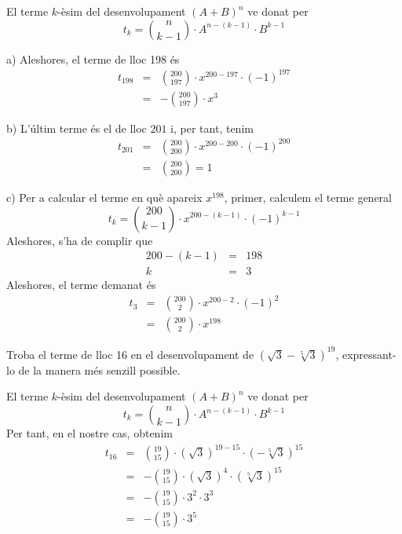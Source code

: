 \begin{solucio}
El terme $k$-èsim del desenvolupament $(A+B)^{n}$ ve donat per\[
t_{k}=\binom{n}{k-1}\cdot A^{n-(k-1)}\cdot B^{k-1}
\]

a) Aleshores, el terme de lloc 198 és\begin{eqnarray*}
t_{198} &=&\binom{200}{197}\cdot x^{200-197}\cdot \left( -1\right) ^{197} \\
&=&-\binom{200}{197}\cdot x^{3}
\end{eqnarray*}

b) L'últim terme és el de lloc $201$ i, per tant, tenim\begin{eqnarray*}
t_{201} &=&\binom{200}{200}\cdot x^{200-200}\cdot \left( -1\right) ^{200} \\
&=&\binom{200}{200}=1
\end{eqnarray*}

c) Per a calcular el terme en què apareix $x^{198}$, primer,
calculem el terme general\[
t_{k}=\binom{200}{k-1}\cdot x^{200-(k-1)}\cdot \left( -1\right) ^{k-1}
\]Aleshores, s'ha de complir que\begin{eqnarray*}
200-(k-1) &=&198 \\
k &=&3
\end{eqnarray*}Aleshores, el terme demanat és\begin{eqnarray*}
t_{3} &=&\binom{200}{2}\cdot x^{200-2}\cdot \left( -1\right) ^{2} \\
&=&\binom{200}{2}\cdot x^{198}
\end{eqnarray*}
\end{solucio}

\begin{exercici}
Troba el terme de lloc 16 en el desenvolupament de $\left( \sqrt{3}-\sqrt[5]{3}\right) ^{19}$, expressant-lo de la manera més senzill possible.
\end{exercici}

\begin{solucio}
El terme $k$-èsim del desenvolupament $(A+B)^{n}$ ve donat per\[
t_{k}=\binom{n}{k-1}\cdot A^{n-(k-1)}\cdot B^{k-1}
\]Per tant, en el nostre cas, obtenim\begin{eqnarray*}
t_{16} &=&\binom{19}{15}\cdot \left( \sqrt{3}\right) ^{19-15}\cdot \left( -\sqrt[5]{3}\right) ^{15} \\
&=&-\binom{19}{15}\cdot \left( \sqrt{3}\right) ^{4}\cdot \left( \sqrt[5]{3}\right) ^{15} \\
&=&-\binom{19}{15}\cdot 3^{2}\cdot 3^{3} \\
&=&-\binom{19}{15}\cdot 3^{5}
\end{eqnarray*}
\end{solucio}

